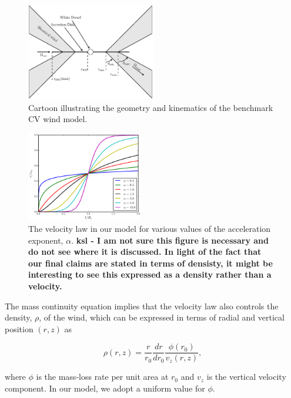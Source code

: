 \documentclass[preprint, a4paper, 11pt]{aastex}
\begin{document}
{\begin{figure}
\centering
\includegraphics[width=0.5\textwidth]{figures/fig2_cartoon.eps}
\caption{Cartoon illustrating the geometry and kinematics of the benchmark CV wind model.}
\label{cartoon}
\end{figure}


\begin{figure}
\centering
\includegraphics[width=0.45\textwidth]{figures/acc_law.eps}
\caption{
The velocity law in our model for various values of
the acceleration exponent, $\alpha$.  {\bf ksl - I am not sure this figure is necessary and do not see where it is discussed.  In light of the fact that our final claims are stated in terms of densisty, it might be interesting to see this expressed as a density rather than a velocity.}
}
\label{acc_law}
\end{figure}



The mass continuity equation implies that the velocity law also 
controls the density, $\rho$, of the wind, which can be expressed in terms
of radial and vertical position $(r,z)$ as 

\begin{equation}
\rho(r,z) = \frac{r}{r_0} \frac{dr}{dr_0} \frac{\phi(r_0)}{v_z(r,z)},
\label{density}
\end{equation}

where $\phi$ is the mass-loss rate per unit area at $r_0$
and $v_z$ is the vertical velocity component. In our model, we
adopt a uniform value for $\phi$. 



}
\end{document}
